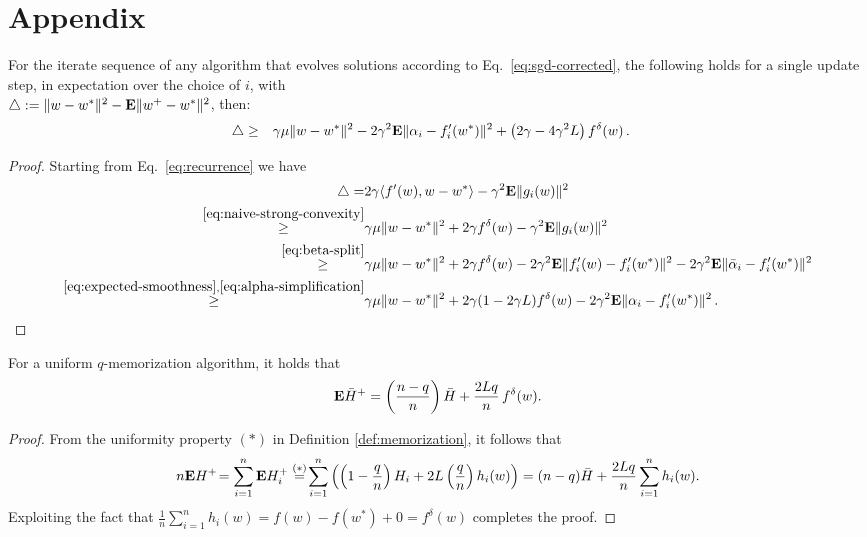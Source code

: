 %

\newpage


\appendix

\section{Appendix}
\label{sec:appendix}

\setcounter{lemma}{0}
\setcounter{theorem}{0}
\setcounter{corollary}{0}

\begin{lemma}
For the iterate sequence of any algorithm that evolves solutions according to Eq.~\eqref{eq:sgd-corrected}, the following holds for a single update step, in expectation over the choice of $i$, with \\$\triangle := \| w - w^*\|^2  - {\mathbf E} \| w^+ - w^*\|^2$, then: 
\begin{align}
\triangle \ge  &\quad \gamma \mu \| w- w^*\|^2  - 2 \gamma^2  \E \| \alpha_i - f_i'(w^*)\|^2  + \left( 2\gamma - 4 \gamma^2 L  \right) f^\delta(w) \,.
\nonumber %
\end{align}
\vspace*{-6mm}
\begin{proof} 
Starting from Eq.~\eqref{eq:recurrence} we have
\begin{align*}
\triangle
= &
2 \gamma \langle f'(w), w-w^*\rangle - \gamma^2 \E \| g_i(w) \|^2 
%
\\ \stackrel{\eqref{eq:naive-strong-convexity}}{\ge} &  
\gamma \mu \| w-w^*\|^2 + 2 \gamma f^\delta (w)  - \gamma^2 \E \| g_i(w) \|^2 \\
%
\stackrel{\eqref{eq:beta-split}}{\ge} &  
\gamma \mu  \| w-w^*\|^2  +  2 \gamma f^\delta (w) 
%
- 2 \gamma^2 \E \| f'_i(w) - f'_i(w^*) \|^2 
-2 \gamma^2  \E \| \bar \alpha_i - f_i'(w^* )\|^2 \\
\stackrel{\eqref{eq:expected-smoothness},\eqref{eq:alpha-simplification}}{\ge} &  
\gamma \mu \| w- w^*\|^2  + 
2 \gamma ( 1 - 2\gamma L  )  f^\delta(w)
  - 2 \gamma^2 \E \| \alpha_i - f_i'(w^*)\|^2  \nonumber
\,.\end{align*}
\end{proof}
\end{lemma}

\begin{lemma} 
For a uniform $q$-memorization algorithm, it holds that 
\begin{align*}
{\mathbf E} \bar H^+ = \left( \frac{n-q}{n} \right) \bar H + \frac{2Lq}{n} \, f^\delta(w).
\end{align*}
\begin{proof} From the uniformity property $(*)$ in Definition \ref{def:memorization}, it follows that 
\begin{align}
n {\mathbf E} H^+ \! = \sum_{i=1}^n {\mathbf E} H^+_i 
\stackrel{(*)}= \! \sum_{i=1}^n \left( \left(1-\frac{q}{n} \right) H_i +  2L\left( \frac{q}{n} \right)h_i(w) \right)
= (n-q) \bar H + \frac {2L q}n \sum_{i=1}^n h_i(w).
\nonumber
\end{align}
Exploiting the fact that $\frac 1n \sum_{i=1}^n h_i(w) = f(w)-f(w^*) + 0= f^\delta(w)$  completes the proof. 
\end{proof} 
\label{lemma:hrecurrence2-appendix}
\end{lemma}

